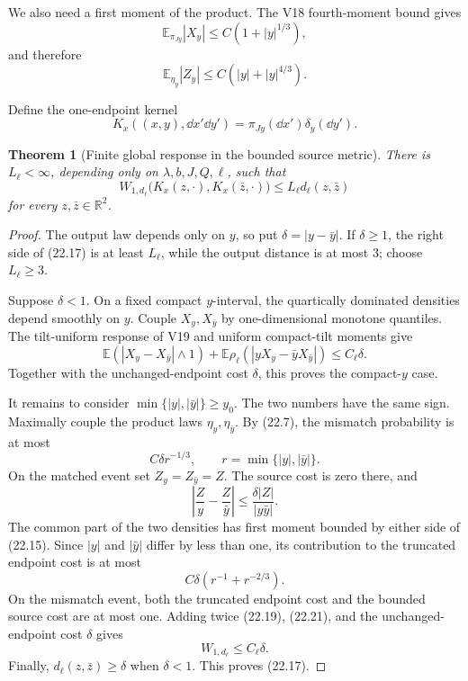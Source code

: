 \documentclass[11pt]{article}
\newtheorem{theorem}{Theorem}[section]
\theoremstyle{remark}
\begin{document}
We also need a first moment of the product.  The V18 fourth-moment
bound gives
\[
 \mathbb E_{\pi_{Jy}}|X_y|
 \le C(1+|y|^{1/3}),                                       \tag{22.14}
\]
and therefore
\[
 \mathbb E_{\eta_y}|Z_y|
 \le C(|y|+|y|^{4/3}).                                     \tag{22.15}
\]

Define the one-endpoint kernel
\[
 K_x((x,y),\dd x'\dd y')
 =
 \pi_{Jy}(\dd x')\delta_y(\dd y').                          \tag{22.16}
\]

\begin{theorem}[Finite global response in the bounded source metric]
\label{thm:v15v22-finite-response}
There is \(L_\ell<\infty\), depending only on
\(\lambda,b,J,Q,\ell\), such that
\[
 \boxed{
 W_{1,d_\ell}
 \bigl(K_x(z,\cdot),K_x(\bar z,\cdot)\bigr)
 \le L_\ell d_\ell(z,\bar z)}                               \tag{22.17}
\]
for every \(z,\bar z\in\mathbb R^2\).
\end{theorem}

\begin{proof}
The output law depends only on \(y\), so put
\(\delta=|y-\bar y|\).  If \(\delta\ge1\), the right side of
(22.17) is at least \(L_\ell\), while the output distance is at
most \(3\); choose \(L_\ell\ge3\).

Suppose \(\delta<1\).  On a fixed compact \(y\)-interval, the
quartically dominated densities depend smoothly on \(y\).
Couple \(X_y,X_{\bar y}\) by one-dimensional monotone quantiles.
The tilt-uniform response of V19 and uniform compact-tilt moments
give
\[
 \mathbb E(|X_y-X_{\bar y}|\wedge1)
 +
 \mathbb E\rho_\ell(|yX_y-\bar yX_{\bar y}|)
 \le C_\ell\delta.                                         \tag{22.18}
\]
Together with the unchanged-endpoint cost \(\delta\), this proves
the compact-\(y\) case.

It remains to consider \(\min\{|y|,|\bar y|\}\ge y_0\).
The two numbers have the same sign.  Maximally couple the product
laws \(\eta_y,\eta_{\bar y}\).  By (22.7), the mismatch probability
is at most
\[
 C\delta r^{-1/3},\qquad
 r=\min\{|y|,|\bar y|\}.                                    \tag{22.19}
\]
On the matched event set \(Z_y=Z_{\bar y}=Z\).  The source cost is
zero there, and
\[
 \left|\frac Z y-\frac Z{\bar y}\right|
 \le\frac{\delta|Z|}{|y\bar y|}.                            \tag{22.20}
\]
The common part of the two densities has first moment bounded by
either side of (22.15).  Since \(|y|\) and \(|\bar y|\) differ by
less than one, its contribution to the truncated endpoint cost is
at most
\[
 C\delta(r^{-1}+r^{-2/3}).                                  \tag{22.21}
\]
On the mismatch event, both the truncated endpoint cost and the
bounded source cost are at most one.  Adding twice (22.19),
(22.21), and the unchanged-endpoint cost \(\delta\) gives
\[
 W_{1,d_\ell}
 \le C_\ell\delta.                                         \tag{22.22}
\]
Finally, \(d_\ell(z,\bar z)\ge\delta\) when \(\delta<1\).
This proves (22.17).
\end{proof}
\end{document}
